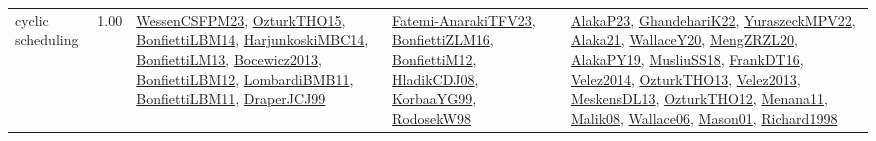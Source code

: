 {\begin{longtable}{p{3cm}r>{\raggedright\arraybackslash}p{6cm}>{\raggedright\arraybackslash}p{6cm}>{\raggedright\arraybackslash}p{8cm}}
\index{cyclic scheduling}\index{Concepts!cyclic scheduling}cyclic scheduling &  1.00 & \hyperref[detail:WessenCSFPM23]{WessenCSFPM23}, \hyperref[detail:OzturkTHO15]{OzturkTHO15}, \hyperref[detail:BonfiettiLBM14]{BonfiettiLBM14}, \hyperref[detail:HarjunkoskiMBC14]{HarjunkoskiMBC14}, \hyperref[detail:BonfiettiLM13]{BonfiettiLM13}, \hyperref[detail:Bocewicz2013]{Bocewicz2013}, \hyperref[detail:BonfiettiLBM12]{BonfiettiLBM12}, \hyperref[detail:LombardiBMB11]{LombardiBMB11}, \hyperref[detail:BonfiettiLBM11]{BonfiettiLBM11}, \hyperref[detail:DraperJCJ99]{DraperJCJ99} & \hyperref[detail:Fatemi-AnarakiTFV23]{Fatemi-AnarakiTFV23}, \hyperref[detail:BonfiettiZLM16]{BonfiettiZLM16}, \hyperref[detail:BonfiettiM12]{BonfiettiM12}, \hyperref[detail:HladikCDJ08]{HladikCDJ08}, \hyperref[detail:KorbaaYG99]{KorbaaYG99}, \hyperref[detail:RodosekW98]{RodosekW98} & \hyperref[detail:AlakaP23]{AlakaP23}, \hyperref[detail:GhandehariK22]{GhandehariK22}, \hyperref[detail:YuraszeckMPV22]{YuraszeckMPV22}, \hyperref[detail:Alaka21]{Alaka21}, \hyperref[detail:WallaceY20]{WallaceY20}, \hyperref[detail:MengZRZL20]{MengZRZL20}, \hyperref[detail:AlakaPY19]{AlakaPY19}, \hyperref[detail:MusliuSS18]{MusliuSS18}, \hyperref[detail:FrankDT16]{FrankDT16}, \hyperref[detail:Velez2014]{Velez2014}, \hyperref[detail:OzturkTHO13]{OzturkTHO13}, \hyperref[detail:Velez2013]{Velez2013}, \hyperref[detail:MeskensDL13]{MeskensDL13}, \hyperref[detail:OzturkTHO12]{OzturkTHO12}, \hyperref[detail:Menana11]{Menana11}, \hyperref[detail:Malik08]{Malik08}, \hyperref[detail:Wallace06]{Wallace06}, \hyperref[detail:Mason01]{Mason01}, \hyperref[detail:Richard1998]{Richard1998}\\

\end{longtable}}
